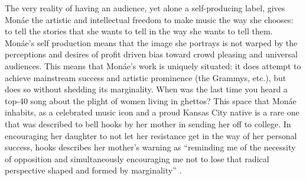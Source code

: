 \documentclass[a4paper, 11pt]{article} %
\begin{document}
The very reality of having an audience, yet alone a self-producing label, gives Mon\'ae the artistic and intellectual freedom to make music the way she chooses: to tell the stories that she wants to tell in the way she wants to tell them.
Mon\'ae's self production means that the image she portrays is not warped by the perceptions and desires of profit driven bias toward crowd pleasing and universal audiences.
This means that Mon\'ae's work is uniquely situated: it does attempt to achieve mainstream success and artistic prominence (the Grammys, etc.), but does so without shedding its marginality.
When was the last time you heard a top-40 song about the plight of women living in ghettos?
This space that Mon\'ae inhabits, as a celebrated music icon and a proud Kansas City native is a rare one that was described to bell hooks by her mother in sending her off to college.
In encouraging her daughter to not let her resistance get in the way of her personal success, hooks describes her mother's warning as ``reminding me of the necessity of opposition and simultaneously encouraging me not to lose that radical perspective shaped and formed by marginality'' \cite{hookschoosing}.
\end{document}
